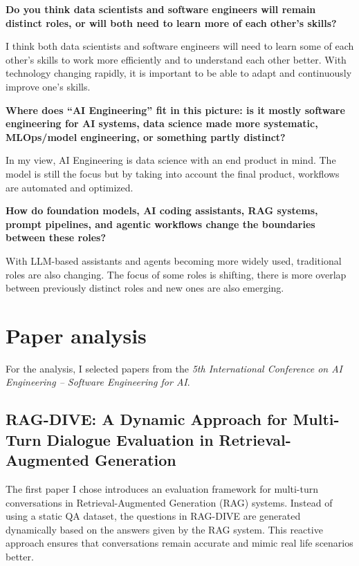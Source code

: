 \documentclass[11pt]{article}
\begin{document}
\textbf{Do you think data scientists and software engineers will remain distinct roles, or will both need to learn more of each other’s skills?}

I think both data scientists and software engineers will need to learn some of each other's skills to work more efficiently and to understand each other better. With technology changing rapidly, it is important to be able to adapt and continuously improve one's skills.

\textbf{Where does “AI Engineering” fit in this picture: is it mostly software engineering for AI systems, data science made more systematic, MLOps/model engineering, or something partly distinct?} 

In my view, AI Engineering is data science with an end product in mind. The model is still the focus but by taking into account the final product, workflows are automated and optimized.

\textbf{How do foundation models, AI coding assistants, RAG systems, prompt pipelines, and agentic workflows change the boundaries between these roles?}

With LLM-based assistants and agents becoming more widely used, traditional roles are also changing. The focus of some roles is shifting, there is more overlap between previously distinct roles and new ones are also emerging. 


\section{Paper analysis}

For the analysis, I selected papers from the \textit{5th International Conference on AI Engineering – Software Engineering for AI}.

\subsection{RAG-DIVE: A Dynamic Approach for Multi-Turn Dialogue Evaluation in Retrieval-Augmented Generation}

The first paper I chose \cite{brehme2026rag} introduces an evaluation framework for multi-turn conversations in Retrieval-Augmented Generation (RAG) systems. Instead of using a static QA dataset, the questions in RAG-DIVE are generated dynamically based on the answers given by the RAG system. This reactive approach ensures that conversations remain accurate and mimic real life scenarios better.
\end{document}
